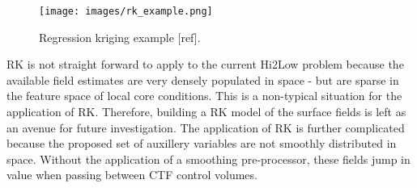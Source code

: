 \begin{figure}[hbtp]
\centering
\texttt{[image: images/rk\_example.png]}
\caption{Regression kriging example [ref].}
\label{fit:rk}
\end{figure}

RK is not straight forward to apply to the current Hi2Low problem because the available field estimates are very densely populated in space - but are sparse in the feature space of local core conditions. This is a non-typical situation for the application of RK. Therefore, building a RK model of the surface fields is left as an avenue for future investigation.
The application of RK is further complicated because the proposed set of auxillery variables are not smoothly distributed in space.  Without the application of a smoothing pre-processor, these
fields jump in value when passing between CTF control volumes.

